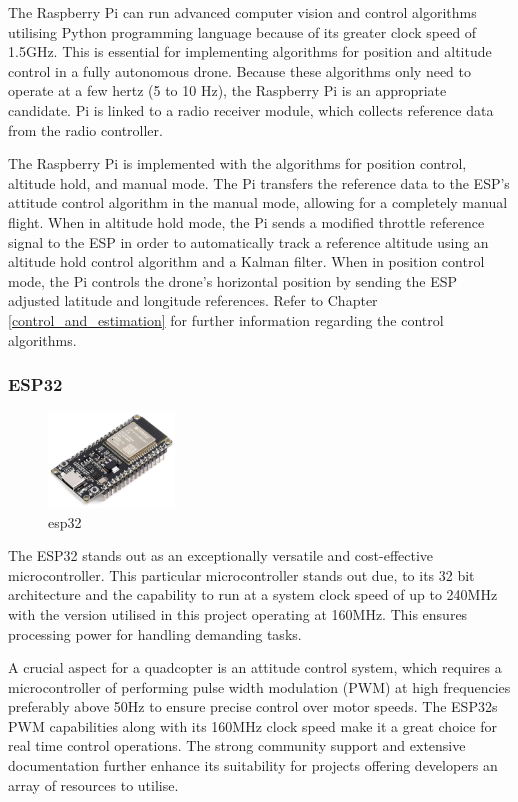 \documentclass{article}
\begin{document}
The Raspberry Pi can run advanced computer vision and control algorithms
utilising Python programming language because of its greater clock speed of
1.5GHz. This is essential for implementing algorithms for position and altitude
control in a fully autonomous drone. Because these algorithms only need to
operate at a few hertz (5 to 10 Hz), the Raspberry Pi is an appropriate
candidate. Pi is linked to a radio receiver module, which collects reference
data from the radio controller.

The Raspberry Pi is implemented with the algorithms for position control,
altitude hold, and manual mode. The Pi transfers the reference data to the ESP's
attitude control algorithm in the manual mode, allowing for a completely manual
flight. When in altitude hold mode, the Pi sends a modified throttle reference
signal to the ESP in order to automatically track a reference altitude using an
altitude hold control algorithm and a Kalman filter. When in position control
mode, the Pi controls the drone's horizontal position by sending the ESP
adjusted latitude and longitude references. Refer to Chapter
\ref{control_and_estimation} for further information regarding the control
algorithms. 

\subsubsection{ESP32}
\begin{figure}[H]
  \centering
  \includegraphics[width=0.3\textwidth]{Pictures/esp32.png}
  \caption{esp32}
  \label{fig:esp32}
\end{figure}
The ESP32 stands out as an exceptionally versatile and cost-effective
microcontroller. This particular microcontroller stands out due, to its 32 bit
architecture and the capability to run at a system clock speed of up to 240MHz
with the version utilised in this project operating at 160MHz. This ensures
processing power for handling demanding tasks.

A crucial aspect for a quadcopter is an attitude control system, which requires
a microcontroller of performing pulse width modulation (PWM) at high frequencies
preferably above 50Hz to ensure precise control over motor speeds. The ESP32s
PWM capabilities along with its 160MHz clock speed make it a great choice for
real time control operations. The strong community support and extensive
documentation further enhance its suitability for projects offering developers
an array of resources to utilise.
\end{document}
